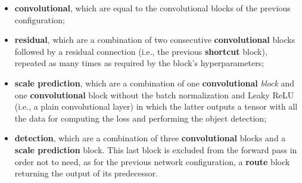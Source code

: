 \documentclass[../report.tex]{subfiles}
\begin{document}
\begin{itemize}
    \item \textbf{convolutional}, which are equal to the convolutional blocks of the previous configuration;
    \item \textbf{residual}, which are a combination of two consecutive \textbf{convolutional} blocks followed by a residual connection (i.e., the previous \textbf{shortcut} block), repeated as many times as required by the block's hyperparameters;
    \item \textbf{scale prediction}, which are a combination of one \textbf{convolutional} \textit{block} and one \textbf{convolutional} block without the batch normalization and Leaky ReLU (i.e., a plain convolutional layer) in which the latter outputs a tensor with all the data for computing the loss and performing the object detection;
    \item \textbf{detection}, which are a combination of three \textbf{convolutional} blocks and a \textbf{scale prediction} block.
    This last block is excluded from the forward pass in order not to need, as for the previous network configuration, a \textbf{route} block returning the output of its predecessor.
\end{itemize}
\end{document}
